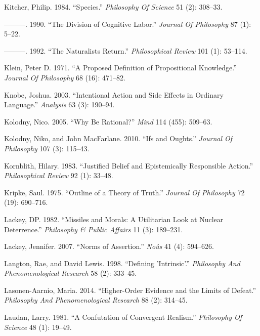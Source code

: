 \documentclass[
  10pt,
  letterpaper,
  DIV=11,
  numbers=noendperiod,
  twoside]{scrartcl}
\newlength{\cslhangindent}
\newenvironment{CSLReferences}[2] %
 {\begin{list}{}{%
  \setlength{\itemindent}{0pt}
  \setlength{\leftmargin}{0pt}
  \setlength{\parsep}{0pt}
  \ifodd #1
   \setlength{\leftmargin}{\cslhangindent}
   \setlength{\itemindent}{-1\cslhangindent}
  \fi
  \setlength{\itemsep}{#2\baselineskip}}}
 {\end{list}}
\begin{document}
\begin{CSLReferences}{1}{0}
Kitcher, Philip. 1984. {``Species.''} \emph{Philosophy Of Science} 51
(2): 308--33.

---------. 1990. {``The Division of Cognitive Labor.''} \emph{Journal Of
Philosophy} 87 (1): 5--22.

---------. 1992. {``The Naturalists Return.''} \emph{Philosophical
Review} 101 (1): 53--114.

Klein, Peter D. 1971. {``A Proposed Definition of Propositional
Knowledge.''} \emph{Journal Of Philosophy} 68 (16): 471--82.

Knobe, Joshua. 2003. {``Intentional Action and Side Effects in Ordinary
Language.''} \emph{Analysis} 63 (3): 190--94.

Kolodny, Nico. 2005. {``Why Be Rational?''} \emph{Mind} 114 (455):
509--63.

Kolodny, Niko, and John MacFarlane. 2010. {``Ifs and Oughts.''}
\emph{Journal Of Philosophy} 107 (3): 115--43.

Kornblith, Hilary. 1983. {``Justified Belief and Epistemically
Responsible Action.''} \emph{Philosophical Review} 92 (1): 33--48.

Kripke, Saul. 1975. {``Outline of a Theory of Truth.''} \emph{Journal Of
Philosophy} 72 (19): 690--716.

Lackey, DP. 1982. {``Missiles and Morals: A Utilitarian Look at Nuclear
Deterrence.''} \emph{Philosophy \& Public Affairs} 11 (3): 189--231.

Lackey, Jennifer. 2007. {``Norms of Assertion.''} \emph{Noûs} 41 (4):
594--626.

Langton, Rae, and David Lewis. 1998. {``Defining 'Intrinsic'.''}
\emph{Philosophy And Phenomenological Research} 58 (2): 333--45.

Lasonen-Aarnio, Maria. 2014. {``Higher-Order Evidence and the Limits of
Defeat.''} \emph{Philosophy And Phenomenological Research} 88 (2):
314--45.

Laudan, Larry. 1981. {``A Confutation of Convergent Realism.''}
\emph{Philosophy Of Science} 48 (1): 19--49.


\end{CSLReferences}
\end{document}
